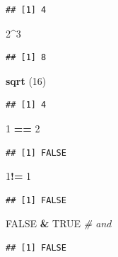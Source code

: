 \documentclass[]{book}
\newenvironment{Shaded}{\begin{snugshade}}{\end{snugshade}}
\newcommand{\CommentTok}[1]{\textcolor[rgb]{0.56,0.35,0.01}{\textit{#1}}}
\newcommand{\DecValTok}[1]{\textcolor[rgb]{0.00,0.00,0.81}{#1}}
\newcommand{\KeywordTok}[1]{\textcolor[rgb]{0.13,0.29,0.53}{\textbf{#1}}}
\newcommand{\NormalTok}[1]{#1}
\newcommand{\OperatorTok}[1]{\textcolor[rgb]{0.81,0.36,0.00}{\textbf{#1}}}
\newcommand{\OtherTok}[1]{\textcolor[rgb]{0.56,0.35,0.01}{#1}}
\newcommand{\StringTok}[1]{\textcolor[rgb]{0.31,0.60,0.02}{#1}}
\begin{document}
\begin{verbatim}
## [1] 4
\end{verbatim}

\begin{Shaded}
\begin{Highlighting}[]
\DecValTok{2}\OperatorTok{^}\DecValTok{3}
\end{Highlighting}
\end{Shaded}

\begin{verbatim}
## [1] 8
\end{verbatim}

\begin{Shaded}
\begin{Highlighting}[]
\KeywordTok{sqrt}\NormalTok{ (}\DecValTok{16}\NormalTok{)}
\end{Highlighting}
\end{Shaded}

\begin{verbatim}
## [1] 4
\end{verbatim}

\begin{Shaded}
\begin{Highlighting}[]
\DecValTok{1} \OperatorTok{==}\StringTok{ }\DecValTok{2}
\end{Highlighting}
\end{Shaded}

\begin{verbatim}
## [1] FALSE
\end{verbatim}

\begin{Shaded}
\begin{Highlighting}[]
\DecValTok{1}\OperatorTok{!=}\StringTok{ }\DecValTok{1}
\end{Highlighting}
\end{Shaded}

\begin{verbatim}
## [1] FALSE
\end{verbatim}

\begin{Shaded}
\begin{Highlighting}[]
\OtherTok{FALSE} \OperatorTok{&}\StringTok{ }\OtherTok{TRUE} \CommentTok{# and}
\end{Highlighting}
\end{Shaded}

\begin{verbatim}
## [1] FALSE
\end{verbatim}
\end{document}
